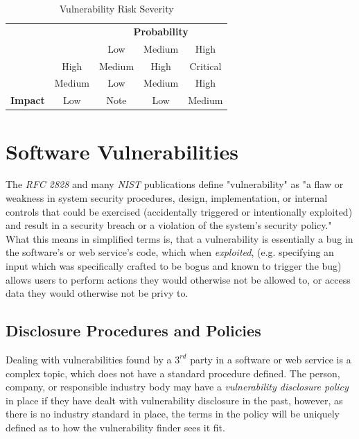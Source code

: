 \documentclass[a4paper,12pt]{article}
\begin{document}
	\begin{table}[!htbp]
		\centering
		\begin{tabular}{ccccc}
			\multicolumn{1}{l}{} & \multicolumn{1}{l}{} & \multicolumn{3}{c}{{\bf Probability}} \\
			\multicolumn{1}{l}{} &  & \cellcolor[HTML]{EFEFEF}Low & \cellcolor[HTML]{C0C0C0}Medium & \cellcolor[HTML]{9B9B9B}High \\
			& \cellcolor[HTML]{9B9B9B}High & \cellcolor[HTML]{F8A102}Medium & \cellcolor[HTML]{FE0000}High & \cellcolor[HTML]{FFCCC9}Critical \\
			& \cellcolor[HTML]{C0C0C0}Medium & \cellcolor[HTML]{FCFF2F}Low & \cellcolor[HTML]{F8A102}Medium & \cellcolor[HTML]{FE0000}High \\
			\multirow{-3}{*}{{\bf Impact}} & \cellcolor[HTML]{EFEFEF}Low & \cellcolor[HTML]{34FF34}Note & \cellcolor[HTML]{FCFF2F}Low & \cellcolor[HTML]{F8A102}Medium
		\end{tabular}
		\caption{Vulnerability Risk Severity}
		\label{vulnrisksever}
	\end{table}

\newpage
\section{Software Vulnerabilities}
	
	The \textit{RFC 2828} and many \textit{NIST} publications define "vulnerability" as "a flaw or weakness in system security procedures, design, implementation, or internal controls that could be exercised (accidentally triggered or intentionally exploited) and result in a security breach or a violation of the system's security policy."\cite{rfc2828,nist80030} What this means in simplified terms is, that a vulnerability is essentially a bug in the software's or web service's code, which when \textit{exploited}, (e.g. specifying an input which was specifically crafted to be bogus and known to trigger the bug) allows users to perform actions they would otherwise not be allowed to, or access data they would otherwise not be privy to.
	
\subsection{Disclosure Procedures and Policies}
	
	Dealing with vulnerabilities found by a $3^{rd}$ party in a software or web service is a complex topic, which does not have a standard procedure defined. The person, company, or responsible industry body may have a \textit{vulnerability disclosure policy} in place if they have dealt with vulnerability disclosure in the past, however, as there is no industry standard in place, the terms in the policy will be uniquely defined as to how the vulnerability finder sees it fit.
	
\end{document}
